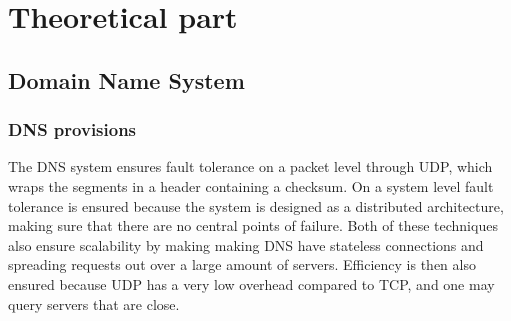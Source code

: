 \section{Theoretical part}

\subsection{Domain Name System}
\subsubsection{DNS provisions}
The DNS system ensures fault tolerance on a packet level through UDP, which
wraps the segments in a header containing a checksum. On a system level fault
tolerance is ensured because the system is designed as a distributed
architecture, making sure that there are no central points of failure. Both of
these techniques also ensure scalability by making making DNS have stateless
connections and spreading requests out over a large amount of servers.
Efficiency is then also ensured because UDP has a very low overhead compared to
TCP, and one may query servers that are close.

